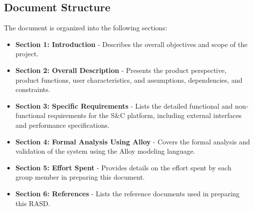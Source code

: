 \subsection{Document Structure}
The document is organized into the following sections:
\begin{itemize}
    \item \textbf{Section 1: Introduction} - Describes the overall objectives and scope of the project.
    \item \textbf{Section 2: Overall Description} - Presents the product perspective, product functions, user characteristics, and assumptions, dependencies, and constraints.
    \item \textbf{Section 3: Specific Requirements} - Lists the detailed functional and non-functional requirements for the S\&C platform, including external interfaces and performance specifications.
    \item \textbf{Section 4: Formal Analysis Using Alloy} - Covers the formal analysis and validation of the system using the Alloy modeling language.
    \item \textbf{Section 5: Effort Spent} - Provides details on the effort spent by each group member in preparing this document.
    \item \textbf{Section 6: References} - Lists the reference documents used in preparing this RASD.
\end{itemize}

\newpage

